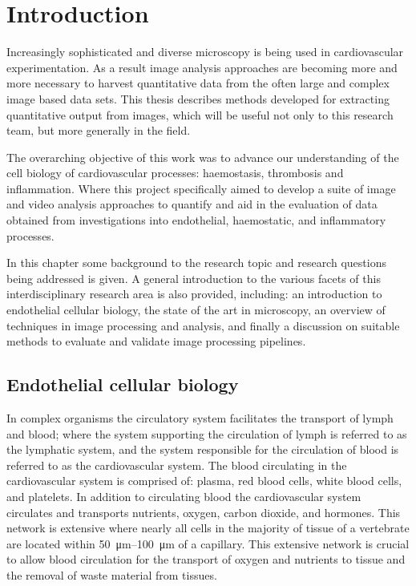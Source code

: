 \chapter{Introduction}
\label{introduction}
\ifpdf
	\graphicspath{{chapter_1/figs/}}
\fi


Increasingly sophisticated and diverse microscopy is being used in cardiovascular experimentation. As a result image analysis approaches are becoming more and more necessary to harvest quantitative data from the often large and complex image based data sets. This thesis describes methods developed for extracting quantitative output from images, which will be useful not only to this research team, but more generally in the field.

The overarching objective of this work was to advance our understanding of the cell biology of cardiovascular processes: haemostasis, thrombosis and inflammation. Where this project specifically aimed to develop a suite of image and video analysis approaches to quantify and aid in the evaluation of data obtained from investigations into endothelial, haemostatic, and inflammatory processes.

In this chapter some background to the research topic and research questions being addressed is given. A general introduction to the various facets of this interdisciplinary research area is also provided, including: an introduction to endothelial cellular biology, the state of the art in microscopy, an overview of techniques in image processing and analysis, and finally a discussion on suitable methods to evaluate and validate image processing pipelines.

\section{Endothelial cellular biology}
\label{introduction:endothelial_cellular_biology}
In complex organisms the circulatory system facilitates the transport of lymph and blood; where the system supporting the circulation of lymph is referred to as the lymphatic system, and the system responsible for the circulation of blood is referred to as the cardiovascular system. The blood circulating in the cardiovascular system is comprised of: plasma, red blood cells, white blood cells, and platelets. In addition to circulating blood the cardiovascular system circulates and transports nutrients, oxygen, carbon dioxide, and hormones. This network is extensive where nearly all cells in the majority of tissue of a vertebrate are located within \SIrange{50}{100}{\micro\meter} of a capillary. This extensive network is crucial to allow blood circulation for the transport of oxygen and nutrients to tissue and the removal of waste material from tissues.

